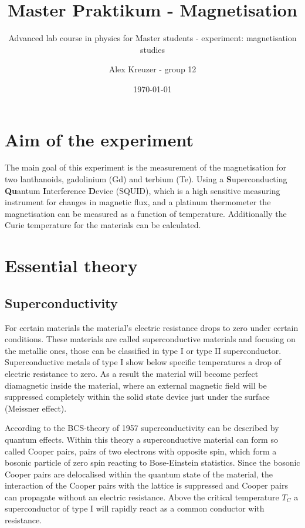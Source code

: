 \documentclass[paper=a4, fontsize=10pt]{scrartcl}
\title{Master Praktikum - Magnetisation}
\subtitle{Advanced lab course in
  physics for Master students - experiment: magnetisation studies}
\author{Alex Kreuzer - group 12}
\date{\normalsize\today}
\begin{document}
\maketitle
\newpage

\renewcommand{\contentsname}{Table of contents}
\tableofcontents

\pagebreak

\section{Aim of the experiment}

The main goal of this experiment is the measurement of the
magnetisation for two lanthanoids, gadolinium (Gd) and terbium (Te).
Using a \textbf{S}uperconducting \textbf{Qu}antum
\textbf{I}nterference \textbf{D}evice (SQUID), which is a high
sensitive measuring instrument for changes in magnetic flux, and a
platinum thermometer the magnetisation can be measured as a function
of temperature. Additionally the Curie temperature for the materials
can be calculated.


\section{Essential theory}

\subsection{Superconductivity}

For certain materials the material's electric resistance drops to zero
under certain conditions. These materials are called superconductive
materials and focusing on the metallic ones, those can be classified
in type I or type II superconductor. Superconductive metals of type I
show below specific temperatures a drop of electric resistance to
zero. As a result the material will become perfect diamagnetic inside
the material, where an external magnetic field will be suppressed
completely within the solid state device just under the surface
(Meissner effect).


According to the BCS-theory of 1957 superconductivity can be described
by quantum effects. Within this theory a superconductive material can
form so called Cooper pairs, pairs of two electrons with opposite
spin, which form a bosonic particle of zero spin reacting to
Bose-Einstein statistics. Since the bosonic Cooper pairs are
delocalised within the quantum state of the material, the interaction
of the Cooper pairs with the lattice is suppressed and Cooper pairs
can propagate without an electric resistance. Above the critical
temperature $T_C$ a superconductor of type I will rapidly react as a
common conductor with resistance.
\end{document}
